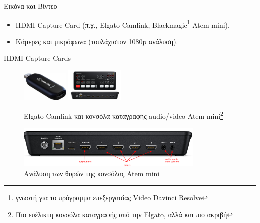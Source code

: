 \documentclass{beamer}
\begin{document}
\begin{frame}[allowframebreaks]{Εικόνα και Βίντεο}

  \begin{itemize}
  \item HDMI Capture Card (π.χ., Elgato Camlink, Blackmagic\footnote{γνωστή για το πρόγραμμα επεξεργασίας Video Davinci Resolve} Atem mini).
  \item Κάμερες και μικρόφωνα (τουλάχιστον 1080p ανάλυση).
  \end{itemize}
  \begin{block}{HDMI Capture Cards}
      \begin{figure}
    \centering
    \includegraphics[width=0.2\textwidth]{images/elgato.jpeg}
    \includegraphics[width=0.25\textwidth]{images/atem.jpg}
    \caption{Elgato Camlink και κονσόλα καταγραφής audio/video Atem mini\footnote{Πιο ευέλικτη κονσόλα καταγραφής από την Elgato, αλλά και πιο ακριβή}}
    \end{figure}
  \end{block}
    \begin{figure}
    \centering
    \includegraphics[width=0.8\textwidth]{images/atem_explanation.png}
    \caption{Ανάλυση των θυρών της κονσόλας Atem mini}
    \end{figure}
\end{frame}
\end{document}
